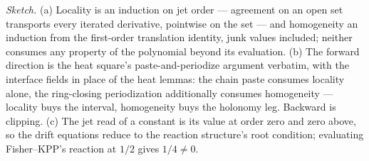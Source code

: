 \emph{Sketch.}  (a) Locality is an induction on jet order ---
agreement on an open set transports every iterated derivative,
pointwise on the set --- and homogeneity an induction from the
first-order translation identity, junk values included; neither
consumes any property of the polynomial beyond its evaluation.
(b) The forward direction is the heat square's paste-and-periodize
argument verbatim, with the interface fields in place of the heat
lemmas: the chain paste consumes locality alone, the ring-closing
periodization additionally consumes homogeneity --- locality buys the
interval, homogeneity buys the holonomy leg.  Backward is clipping.
(c) The jet read of a constant is its value at order zero and zero
above, so the drift equations reduce to the reaction structure's
root condition; evaluating Fisher--KPP's reaction at $1/2$ gives
$1/4 \ne 0$.

